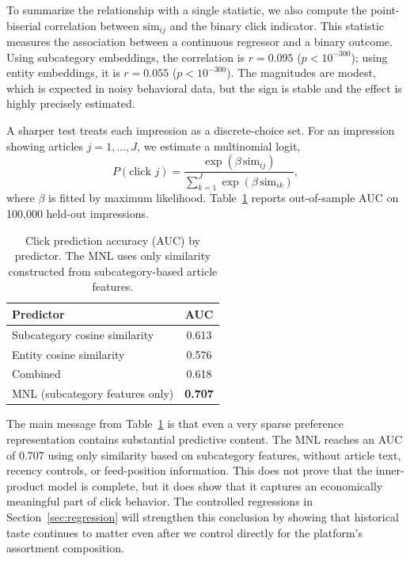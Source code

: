 \documentclass[11pt]{article}
\begin{document}
To summarize the relationship with a single statistic, we also compute the point-biserial correlation between $\text{sim}_{ij}$ and the binary click indicator. This statistic measures the association between a continuous regressor and a binary outcome. Using subcategory embeddings, the correlation is $r = 0.095$ ($p < 10^{-300}$); using entity embeddings, it is $r = 0.055$ ($p < 10^{-300}$). The magnitudes are modest, which is expected in noisy behavioral data, but the sign is stable and the effect is highly precisely estimated.

A sharper test treats each impression as a discrete-choice set. For an impression showing articles $j=1,\ldots,J$, we estimate a multinomial logit,
\[
P(\text{click }j) = \frac{\exp(\beta\,\text{sim}_{ij})}{\sum_{k=1}^{J}\exp(\beta\,\text{sim}_{ik})},
\]
where $\beta$ is fitted by maximum likelihood. Table~\ref{tab:auc} reports out-of-sample AUC on 100,000 held-out impressions.

\begin{table}[ht]
\centering
\caption{Click prediction accuracy (AUC) by predictor. The MNL uses only similarity constructed from subcategory-based article features.}
\label{tab:auc}
\begin{tabular}{lc}
\toprule
Predictor & AUC \\
\midrule
Subcategory cosine similarity & 0.613 \\
Entity cosine similarity & 0.576 \\
Combined & 0.618 \\
MNL (subcategory features only) & \textbf{0.707} \\
\bottomrule
\end{tabular}
\end{table}
\FloatBarrier

The main message from Table~\ref{tab:auc} is that even a very sparse preference representation contains substantial predictive content. The MNL reaches an AUC of 0.707 using only similarity based on subcategory features, without article text, recency controls, or feed-position information. This does not prove that the inner-product model is complete, but it does show that it captures an economically meaningful part of click behavior. The controlled regressions in Section~\ref{sec:regression} will strengthen this conclusion by showing that historical taste continues to matter even after we control directly for the platform's assortment composition.


\end{document}
